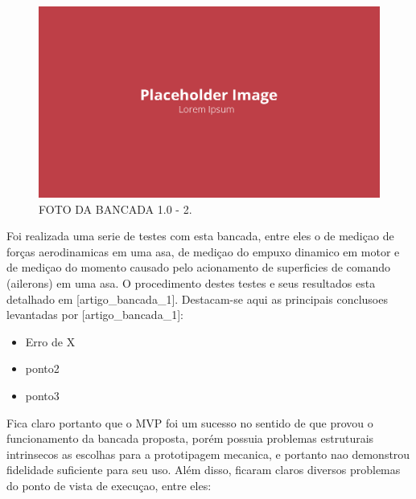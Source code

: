 \begin{figure}[!ht]
    \centering
    \includegraphics[width=.8\linewidth]{figuras/placeholder.png}
    \caption{FOTO DA BANCADA 1.0 - 2\cite{autor}.}
    \label{fig:placeholder}
\end{figure}

Foi realizada uma serie de testes com esta bancada, entre eles o de mediçao de forças aerodinamicas em uma asa, de mediçao do empuxo dinamico em motor e de mediçao do momento causado pelo acionamento de superficies de comando (ailerons) em uma asa. O procedimento destes testes e seus resultados esta detalhado em [artigo_bancada_1]. Destacam-se aqui as principais conclusoes levantadas por [artigo_bancada_1]:

\begin{itemize}
    \item Erro de X%
    \item ponto2
    \item ponto3
\end{itemize}

Fica claro portanto que o MVP foi um sucesso no sentido de que provou o funcionamento da bancada proposta, porém possuia problemas estruturais intrinsecos as escolhas para a prototipagem mecanica, e portanto nao demonstrou fidelidade suficiente para seu uso. Além disso, ficaram claros diversos problemas do ponto de vista de execuçao, entre eles:

